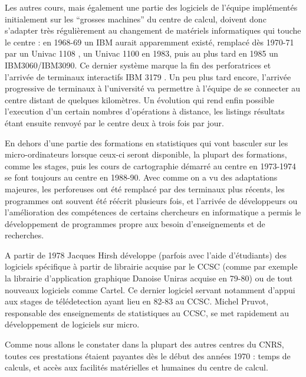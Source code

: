 Les autres cours, mais également une partie des logiciels de l'équipe implémentés initialement sur les \enquote{grosses machines} du centre de calcul, doivent donc s'adapter très régulièrement au changement de matériels informatiques qui touche le centre : en 1968-69 un IBM aurait apparemment existé, remplacé dès 1970-71 par un Univac 1108 \textcite{Dalmasso1971}, un Univac 1100 en 1983, puis au plus tard en 1985 un IBM3060/IBM3090. Ce dernier système marque la fin des perforatrices et l'arrivée de terminaux interactifs IBM 3179 \autocites{Rimbert1984,Cauvin1986}. Un peu plus tard encore, l'arrivée progressive de terminaux à l'université va permettre à l'équipe de se connecter au centre distant de quelques kilomètres. Un évolution qui rend enfin possible l'execution d'un certain nombres d'opérations à distance, les listings résultats étant ensuite renvoyé par le centre deux à trois fois par jour.

En dehors d'une partie des formations en statistiques qui vont basculer sur les micro-ordinateurs lorsque ceux-ci seront disponible, la plupart des formations, comme les stages, puis les cours de cartographie démarré au centre en 1973-1974 se font toujours au centre en 1988-90. Avec comme on a vu des adaptations majeures, les perforeuses ont été remplacé par des terminaux plus récents, les programmes ont souvent été réécrit plusieurs fois, et  l'arrivée de développeurs ou l'amélioration des compétences de certains chercheurs en informatique a permis le développement de programmes propre aux besoin d'enseignements et de recherches.

A partir de 1978 Jacques Hirsh développe (parfois avec l'aide d'étudiants) des logiciels spécifique à partir de librairie acquise par le CCSC (comme par exemple la librairie d'application graphique Danoise Uniras acquise en 79-80) ou de tout nouveaux logiciels comme Cartel. Ce dernier logiciel servant notamment d'appui aux stages de télédetection ayant lieu en 82-83 au CCSC. Michel Pruvot, responsable des enseignements de statistiques au CCSC, se met rapidement au développement de logiciels sur micro.


Comme nous allons le constater dans la plupart des autres centres du CNRS, toutes ces prestations étaient payantes dès le début des années 1970 : temps de calculs, et accès aux facilités matérielles et humaines du centre de calcul.

